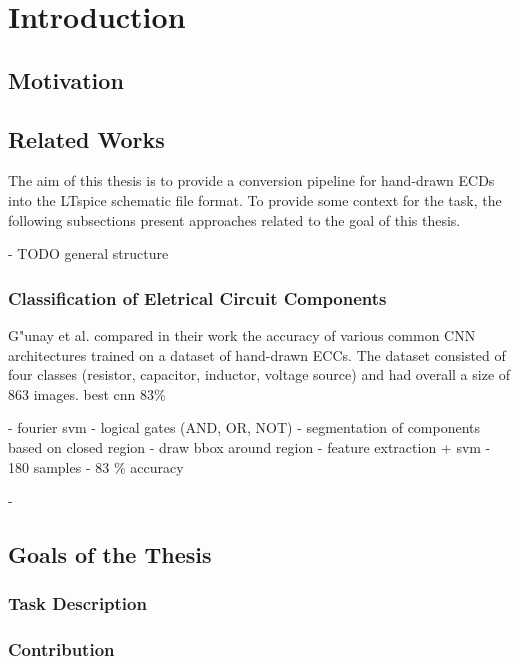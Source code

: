 \chapter{Introduction}

\section{Motivation}

\section{Related Works}

The aim of this thesis is to provide a conversion pipeline for hand-drawn \acp{ECD} into the LTspice schematic file format.
To provide some context for the task, the following subsections present approaches related to the goal of this thesis.

- TODO general structure

\subsection{Classification of Eletrical Circuit Components}

G"unay et al. \cite{ecd_basecnn} compared in their work the accuracy of various common \ac{CNN} architectures trained on a dataset of hand-drawn \acp{ECC}.
The dataset consisted of four classes (resistor, capacitor, inductor, voltage source) and had overall a size of 863 images. best cnn 83\%

- fourier svm
- logical gates (AND, OR, NOT)
- segmentation of components based on closed region
- draw bbox around region
- feature extraction + svm
- 180 samples
- 83 \% accuracy

-



\section{Goals of the Thesis}

\subsection{Task Description}

\subsection{Contribution}
